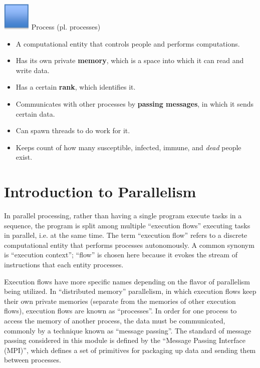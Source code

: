 \documentclass[letterpaper,10pt,openany,oneside]{sphinxmanual}
\begin{document}
\includegraphics{img-5.png} Process (pl. processes)
\begin{itemize}
\item {} 
A computational entity that controls people and performs computations.

\item {} 
Has its own private \textbf{memory}, which is a space into which it can read and write data.

\item {} 
Has a certain \textbf{rank}, which identifies it.

\item {} 
Communicates with other processes by \textbf{passing messages}, in which it sends certain data.

\item {} 
Can spawn threads to do work for it.

\item {} 
Keeps count of how many susceptible, infected, immune, and \emph{dead} people exist.

\end{itemize}


\section{Introduction to Parallelism}
\label{0-Introduction/introduction:introduction-to-parallelism}
In parallel processing, rather than having a single program execute
tasks in a sequence, the program is split among multiple “execution
flows” executing tasks in parallel, i.e. at the same time. The term
“execution flow” refers to a discrete computational entity that performs
processes autonomously. A common synonym is “execution context”; “flow”
is chosen here because it evokes the stream of instructions that each
entity processes.

Execution flows have more specific names depending on the flavor of
parallelism being utilized. In “distributed memory” parallelism, in
which execution flows keep their own private memories (separate from the
memories of other execution flows), execution flows are known as
“processes”. In order for one process to access the memory of another
process, the data must be communicated, commonly by a technique known as
“message passing”. The standard of message passing considered in this
module is defined by the “Message Passing Interface (MPI)”, which
defines a set of primitives for packaging up data and sending them
between processes.
\end{document}
